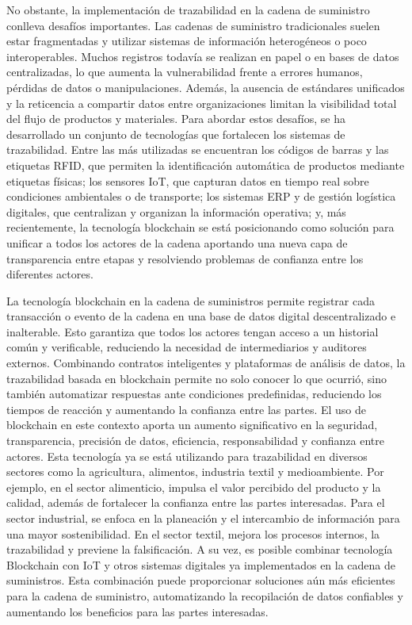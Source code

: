No obstante, la implementación de trazabilidad en la cadena de suministro conlleva desafíos importantes. Las cadenas de suministro tradicionales suelen estar fragmentadas y utilizar sistemas de información heterogéneos o poco interoperables. Muchos registros todavía se realizan en papel o en bases de datos centralizadas, lo que aumenta la vulnerabilidad frente a errores humanos, pérdidas de datos o manipulaciones. Además, la ausencia de estándares unificados y la reticencia a compartir datos entre organizaciones limitan la visibilidad total del flujo de productos y materiales. Para abordar estos desafíos, se ha desarrollado un conjunto de tecnologías que fortalecen los sistemas de trazabilidad. Entre las más utilizadas se encuentran los códigos de barras y las etiquetas RFID, que permiten la identificación automática de productos mediante etiquetas físicas; los sensores IoT, que capturan datos en tiempo real sobre condiciones ambientales o de transporte; los sistemas ERP y de gestión logística digitales, que centralizan y organizan la información operativa; y, más recientemente, la tecnología blockchain se está posicionando como solución para unificar a todos los actores de la cadena aportando una nueva capa de transparencia entre etapas y resolviendo problemas de confianza entre los diferentes actores.

La tecnología blockchain en la cadena de suministros permite registrar cada transacción o evento de la cadena en una base de datos digital descentralizado e inalterable. Esto garantiza que todos los actores tengan acceso a un historial común y verificable, reduciendo la necesidad de intermediarios y auditores externos. Combinando contratos inteligentes y plataformas de análisis de datos, la trazabilidad basada en blockchain permite no solo conocer lo que ocurrió, sino también automatizar respuestas ante condiciones predefinidas, reduciendo los tiempos de reacción y aumentando la confianza entre las partes. El uso de blockchain en este contexto aporta un aumento significativo en la seguridad, transparencia, precisión de datos, eficiencia, responsabilidad y confianza entre actores. Esta tecnología ya se está utilizando para trazabilidad en diversos sectores como la agricultura, alimentos, industria textil y medioambiente. Por ejemplo, en el sector alimenticio, impulsa el valor percibido del producto y la calidad, además de fortalecer la confianza entre las partes interesadas. Para el sector industrial, se enfoca en la planeación y el intercambio de información para una mayor sostenibilidad. En el sector textil, mejora los procesos internos, la trazabilidad y previene la falsificación. A su vez, es posible combinar tecnología Blockchain con IoT y otros sistemas digitales ya implementados en la cadena de suministros. Esta combinación puede proporcionar soluciones aún más eficientes para la cadena de suministro, automatizando la recopilación de datos confiables y aumentando los beneficios para las partes interesadas.

